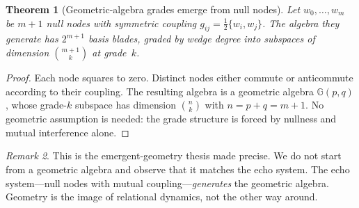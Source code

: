 \documentclass[11pt,a4paper]{article}
\theoremstyle{plain}
\newtheorem{theorem}{Theorem}[section]
\theoremstyle{definition}
\theoremstyle{remark}
\newtheorem{remark}[theorem]{Remark}
\numberwithin{equation}{section}
\newcommand{\Cl}{\mathbb{G}}
\begin{document}
\begin{theorem}[Geometric-algebra grades emerge from null nodes]
\label{thm:grade-emergence}
Let \(w_0,\ldots,w_{m}\) be \(m+1\) null nodes with
symmetric coupling \(g_{ij}=\tfrac12\{w_i,w_j\}\).  The
algebra they generate has \(2^{m+1}\) basis blades, graded by wedge
degree into subspaces of dimension \(\binom{m+1}{k}\) at grade~\(k\).
\end{theorem}

\begin{proof}
Each node squares to zero.  Distinct nodes either commute
or anticommute according to their coupling.  The resulting algebra
is a geometric algebra \(\Cl(p,q)\), whose grade-\(k\) subspace has
dimension \(\binom{n}{k}\) with \(n=p+q=m+1\).  No geometric
assumption is needed: the grade structure is forced by nullness and
mutual interference alone.
\end{proof}

\begin{remark}
This is the emergent-geometry thesis made precise.  We do not start
from a geometric algebra and observe that it matches the echo
system.  The echo system---null nodes with mutual coupling---\emph{generates}
the geometric algebra.  Geometry is the image of relational dynamics,
not the other way around.
\end{remark}
\end{document}
